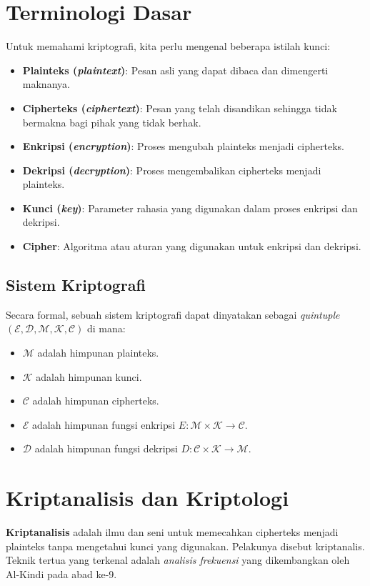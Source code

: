 \documentclass[../main.tex]{subfiles}
\begin{document}
\section{Terminologi Dasar}
Untuk memahami kriptografi, kita perlu mengenal beberapa istilah kunci:
\begin{itemize}
    \item \textbf{Plainteks (\textit{plaintext})}: Pesan asli yang dapat dibaca dan dimengerti maknanya.
    \item \textbf{Cipherteks (\textit{ciphertext})}: Pesan yang telah disandikan sehingga tidak bermakna bagi pihak yang tidak berhak.
    \item \textbf{Enkripsi (\textit{encryption})}: Proses mengubah plainteks menjadi cipherteks.
    \item \textbf{Dekripsi (\textit{decryption})}: Proses mengembalikan cipherteks menjadi plainteks.
    \item \textbf{Kunci (\textit{key})}: Parameter rahasia yang digunakan dalam proses enkripsi dan dekripsi.
    \item \textbf{Cipher}: Algoritma atau aturan yang digunakan untuk enkripsi dan dekripsi.
\end{itemize}

\subsection{Sistem Kriptografi}
Secara formal, sebuah sistem kriptografi dapat dinyatakan sebagai \textit{quintuple} $(\mathcal{E},\allowbreak \mathcal{D},\allowbreak \mathcal{M},\allowbreak \mathcal{K},\allowbreak \mathcal{C})$ di mana:
\begin{itemize}
    \item $\mathcal{M}$ adalah himpunan plainteks.
    \item $\mathcal{K}$ adalah himpunan kunci.
    \item $\mathcal{C}$ adalah himpunan cipherteks.
    \item $\mathcal{E}$ adalah himpunan fungsi enkripsi $E: \mathcal{M} \times \mathcal{K} \to \mathcal{C}$.
    \item $\mathcal{D}$ adalah himpunan fungsi dekripsi $D: \mathcal{C} \times \mathcal{K} \to \mathcal{M}$.
\end{itemize}

\section{Kriptanalisis dan Kriptologi}
\textbf{Kriptanalisis} adalah ilmu dan seni untuk memecahkan cipherteks menjadi plainteks tanpa mengetahui kunci yang digunakan. Pelakunya disebut kriptanalis. Teknik tertua yang terkenal adalah \textit{analisis frekuensi} yang dikembangkan oleh Al-Kindi pada abad ke-9.
\end{document}
